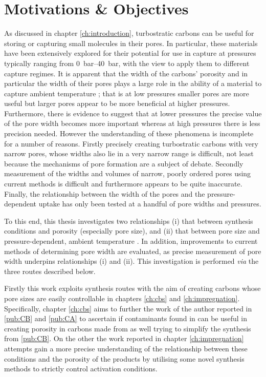 \chapter{Motivations \& Objectives}
\label{ch:motivations_objectives} 

As discussed in chapter \ref{ch:introduction}, \glspl{turbostratic carbon} can be useful for storing or capturing small molecules in their pores. In particular, these materials have been extensively explored for their potential for use in  capture at pressures typically ranging from \qtyrange{0}{40}{\bar}, with the view to apply them to different  capture regimes. It is apparent that the width of the carbons' porosity and in particular the width of their pores plays a large role in the ability of a material to capture ambient temperature ; that is at low pressures smaller pores are more useful but larger pores appear to be more beneficial at higher pressures. Furthermore, there is evidence to suggest that at lower pressures the precise value of the pore width becomes more important whereas at high pressures there is less precision needed. However the understanding of these phenomena is incomplete for a number of reasons. Firstly precisely creating \glspl{turbostratic carbon} with very narrow pores, whose widths also lie in a very narrow range is difficult, not least because the mechanisms of pore formation are a subject of debate. Secondly measurement of the widths and volumes of narrow, poorly ordered pores using current methods is difficult and furthermore appears to be quite inaccurate. Finally, the relationship between the width of the pores and the pressure-dependent  uptake has only been tested at a handful of pore widths and pressures.  

To this end, this thesis investigates two relationships (i) that between synthesis conditions and porosity (especially pore size), and (ii) that between pore size and pressure-dependent, ambient temperature . In addition, improvements to current methods of determining pore width are evaluated, as precise measurement of pore width underpins relationships (i) and (ii). This investigation is performed \textit{via} the three routes described below.

Firstly this work exploits synthesis routes with the aim of creating carbons whose pore sizes are easily controllable in chapters \ref{ch:cbs} and \ref{ch:impregnation}. Specifically, chapter \ref{ch:cbs} aims to further the work of the author reported in \ref{pub:CB} and \ref{pub:CA} to ascertain if contaminants found in  can be useful in creating porosity in carbons made from  as well trying to simplify the synthesis from \ref{pub:CB}. On the other the work reported in chapter \ref{ch:impregnation} attempts gain a more precise understanding of the relationship between these conditions and the porosity of the products by utilising some novel synthesis methods to strictly control activation conditions. 

